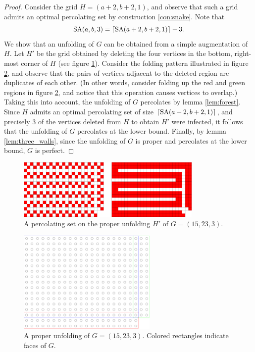 \begin{proof}
Consider the grid $H=(a+2,b+2,1)$, and observe that such a grid admits an optimal percolating set by construction \ref{con:snake}. Note that
$$\text{SA}(a,b,3) = \lceil\text{SA}(a+2,b+2,1)\rceil - 3.$$
We show that an unfolding of $G$ can be obtained from a simple augmentation of $H$. Let $H'$ be the grid obtained by deleting the four vertices in the bottom, right-most corner of $H$ (see figure \ref{fig:17x25x1_unfolded}). Consider the folding pattern illustrated in figure \ref{fig:17x25x1_manifold}, and observe that the pairs of vertices adjacent to the deleted region are duplicates of each other. (In other words, consider folding up the red and green regions in figure \ref{fig:17x25x1_manifold}, and notice that this operation causes vertices to overlap.) Taking this into account, the unfolding of $G$ percolates by lemma \ref{lem:forest}. Since $H$ admits an optimal percolating set of size $\lceil\text{SA}(a+2,b+2,1)\rceil$, and precisely 3 of the vertices deleted from $H$ to obtain $H'$ were infected, it follows that the unfolding of $G$ percolates at the lower bound. Finally, by lemma \ref{lem:three_walls}, since the unfolding of $G$ is proper and percolates at the lower bound, $G$ is perfect.
\end{proof}

\begin{figure}[]
\centering
\includegraphics[width=0.8\textwidth]{figures/4/17x25x1_unfolded.pdf}
\caption{A percolating set on the proper unfolding $H'$ of $G= (15,23,3)$.}
\label{fig:17x25x1_unfolded}
\end{figure}

\begin{figure}[]
\centering
\includegraphics[width=0.6\textwidth]{figures/4/17x25x1_manifold.pdf}
\caption{A proper unfolding of $G= (15,23,3)$. Colored rectangles indicate faces of $G$. }
\label{fig:17x25x1_manifold}
\end{figure}

